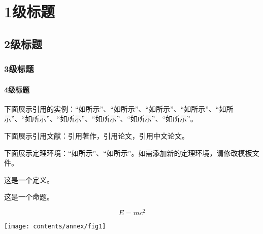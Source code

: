 \chapter{1级标题}\label{cha_one}
\section{2级标题}\label{sec_two}
\subsection{3级标题}\label{subsec_three}
\subsubsection{4级标题}\label{subsubsec_four}

下面展示引用的实例：“如所示”、“如所示”、“如所示”、“如所示”、“如所示”、“如所示”、“如所示”、“如所示”、“如所示”、“如所示”。

下面展示引用文献：引用著作，引用论文，引用中文论文。

下面展示定理环境：“如所示”、“如所示”。如需添加新的定理环境，请修改模板文件。
\begin{defn}\label{def_1}
	这是一个定义。
\end{defn}
\begin{prop}\label{prop_2}
	这是一个命题。
\end{prop}

\begin{equation}\label{eq_emc}
	E=mc^2
\end{equation}

\begin{bjtufigure}
\end{bjtufigure}

\begin{bjtufigure}
\texttt{[image: contents/annex/fig1]}
\end{bjtufigure}


